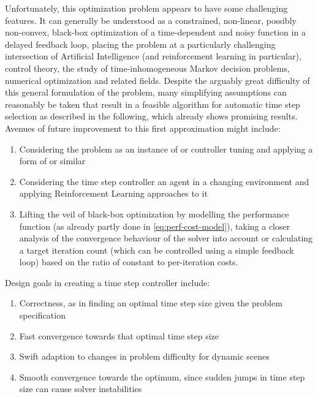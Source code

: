 \documentclass[oneside, a4paper]{book}
\begin{document}
    Unfortunately, this optimization problem appears to have some challenging features. It can generally be understood as a constrained, non-linear, possibly non-convex, black-box optimization of a time-dependent and noisy function in a delayed feedback loop, placing the problem at a particularly challenging intersection of Artificial Intelligence (and reinforcement learning in particular), control theory, the study of time-inhomogeneous Markov decision problems, numerical optimization and related fields. Despite the arguably great difficulty of this general formulation of the problem, many simplifying assumptions can reasonably be taken that result in a feasible algorithm for automatic time step selection as described in the following, which already shows promising results. Avenues of future improvement to this first approximation might include:
    \begin{enumerate}
      \item Considering the problem as an instance of \autocite[online learning for black box optimization]{bbo-bayesian-phd} or controller tuning and applying a form of \autocite[Time-Varying Bayesian Optimization]{time-varying-bo} or similar \autocite[time-varying optimization]{tvopt-library}
      \item Considering the time step controller an agent in a changing environment and applying Reinforcement Learning approaches to it 
      \item Lifting the veil of black-box optimization by modelling the performance function (as already partly done in \autoref{eq:perf-cost-model}), taking a closer analysis of the convergence behaviour of the solver into account or calculating a target iteration count (which can be controlled using a simple feedback loop) based on the ratio of constant to per-iteration costs.
    \end{enumerate} 

    Design goals in creating a time step controller include:
    \begin{enumerate}
      \item Correctness, as in finding an optimal time step size given the problem specification
      \item Fast convergence towards that optimal time step size
      \item Swift adaption to changes in problem difficulty for dynamic scenes
      \item Smooth convergence towards the optimum, since sudden jumps in time step size can cause solver instabilities
    \end{enumerate}
\end{document}
